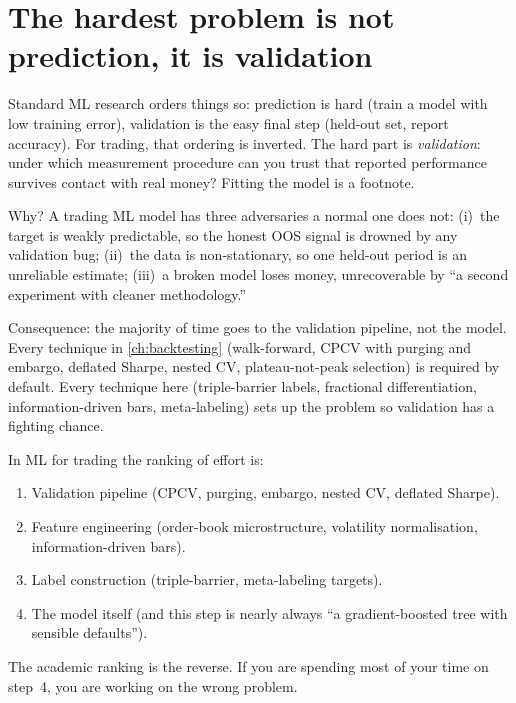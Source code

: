 \section{The hardest problem is not prediction, it is validation}
\label{sec:ml_validation_is_hard}

Standard ML research orders things so: prediction is hard (train a
model with low training error), validation is the easy final step
(held-out set, report accuracy). For trading, that ordering is
inverted. The hard part is \emph{validation}: under which
measurement procedure can you trust that reported performance
survives contact with real money? Fitting the model is a footnote.

Why? A trading ML model has three adversaries a normal one does
not: (i)~the target is weakly predictable, so the honest OOS
signal is drowned by any validation bug; (ii)~the data is
non-stationary, so one held-out period is an unreliable estimate;
(iii)~a broken model loses money, unrecoverable by ``a second
experiment with cleaner methodology.''

Consequence: the majority of time goes to the validation pipeline,
not the model. Every technique in \cref{ch:backtesting}
(walk-forward, CPCV with purging and embargo, deflated Sharpe,
nested CV, plateau-not-peak selection) is required by default.
Every technique here (triple-barrier labels, fractional
differentiation, information-driven bars, meta-labeling) sets
up the problem so validation has a fighting chance.

\begin{keyfactbox}
In ML for trading the ranking of effort is:
\begin{enumerate}
  \item Validation pipeline (CPCV, purging, embargo,
  nested CV, deflated Sharpe).
  \item Feature engineering (order-book microstructure,
  volatility normalisation, information-driven bars).
  \item Label construction (triple-barrier, meta-labeling
  targets).
  \item The model itself (and this step is nearly always
  ``a gradient-boosted tree with sensible defaults'').
\end{enumerate}
The academic ranking is the reverse. If you are spending most
of your time on step~4, you are working on the wrong problem.
\end{keyfactbox}

